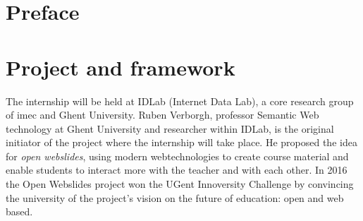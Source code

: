 \documentclass[10pt,a4paper]{article}
\makeatletter
\newcommand{\coursename}{Internship Applied Computer Science}
\newcommand{\courseyear}{Academy year 2017-2018}
\newcommand{\documenttitle}{Internship report}
\newcommand{\authoronename}{Jasper D'haene}
\newcommand{\authoroneemail}{jasper.dhaene@gmail.com}
\newcommand{\authortwoname}{Florian Dejonckheere}
\newcommand{\authortwoemail}{florian@dejonckhee.re}
\newcommand{\hogentlogo}{hogent-logo.png}
\newcommand{\hogentheader}{header.png}
\newcommand{\florian}[1]{\ifthenelse{\isundefined{\isflorian}}{}{#1}}
\newcommand{\jasper}[1]{\ifthenelse{\isundefined{\isjasper}}{}{#1}}
\newcommand{\isflorian}{}
\makeatother
\begin{document}
  


  \nopagecolor
  \renewcommand{\footrulewidth}{0.4pt}
  \headheight 45pt
  \ULCornerWallPaper{1}{\hogentheader}
  \fancyfoot[C]{\thepage}

  \tableofcontents

  \cleardoublepage{}

  \section{Preface}

  \section{Project and framework}
    The internship will be held at IDLab (Internet Data Lab), a core research group of imec and Ghent University.
    Ruben Verborgh, professor Semantic Web technology at Ghent University and researcher within IDLab, is the original initiator of the project where the internship will take place.
    He proposed the idea for \textit{open webslides}, using modern webtechnologies to create course material and enable students to interact more with the teacher and with each other.
  In 2016 the Open Webslides project won the UGent Innoversity Challenge by convincing the university of the project's vision on the future of education: open and web based.
\end{document}
